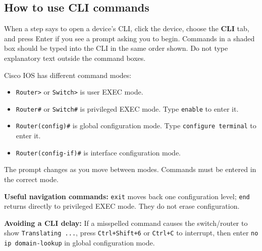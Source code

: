 \documentclass[11pt,a4paper]{article}
\newcommand{\term}[2]{\noindent\textbf{#1:} #2\par\vspace{3pt}}
\begin{document}
\subsection*{How to use CLI commands}
When a step says to open a device's CLI, click the device, choose the \textbf{CLI} tab, and press Enter if you see a prompt asking you to begin. Commands in a shaded box should be typed into the CLI in the same order shown. Do not type explanatory text outside the command boxes.

Cisco IOS has different command modes:
\begin{itemize}
\item \texttt{Router>} or \texttt{Switch>} is user EXEC mode.
\item \texttt{Router\#} or \texttt{Switch\#} is privileged EXEC mode. Type \texttt{enable} to enter it.
\item \texttt{Router(config)\#} is global configuration mode. Type \texttt{configure terminal} to enter it.
\item \texttt{Router(config-if)\#} is interface configuration mode.
\end{itemize}
The prompt changes as you move between modes. Commands must be entered in the correct mode.

\term{Useful navigation commands}{\texttt{exit} moves back one configuration level; \texttt{end} returns directly to privileged EXEC mode. They do not erase configuration.}
\term{Avoiding a CLI delay}{If a misspelled command causes the switch/router to show \texttt{Translating ...}, press \texttt{Ctrl+Shift+6} or \texttt{Ctrl+C} to interrupt, then enter \texttt{no ip domain-lookup} in global configuration mode.}
\end{document}
